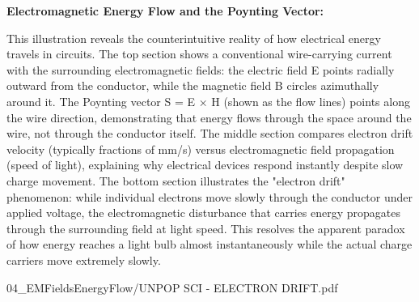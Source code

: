 \begin{SideNotePage}{
  \textbf{Electromagnetic Energy Flow and the Poynting Vector:} \par
  This illustration reveals the counterintuitive reality of how electrical energy travels in circuits. The top section shows a conventional wire-carrying current with the surrounding electromagnetic fields: the electric field E points radially outward from the conductor, while the magnetic field B circles azimuthally around it. The Poynting vector S = E × H (shown as the flow lines) points along the wire direction, demonstrating that energy flows through the space around the wire, not through the conductor itself. The middle section compares electron drift velocity (typically fractions of mm/s) versus electromagnetic field propagation (speed of light), explaining why electrical devices respond instantly despite slow charge movement. The bottom section illustrates the "electron drift" phenomenon: while individual electrons move slowly through the conductor under applied voltage, the electromagnetic disturbance that carries energy propagates through the surrounding field at light speed. This resolves the apparent paradox of how energy reaches a light bulb almost instantaneously while the actual charge carriers move extremely slowly.
}{04_EMFieldsEnergyFlow/UNPOP SCI - ELECTRON DRIFT.pdf}
\end{SideNotePage}